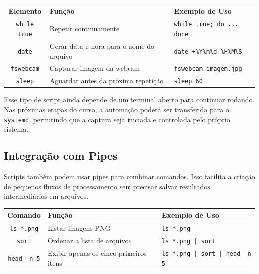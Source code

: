 \documentclass[12pt]{article}
\begin{document}
\begin{cmdbox}
\begin{tabularx}{\linewidth}{@{}C >{\raggedright\arraybackslash}X >{\raggedright\arraybackslash}X@{}}
\toprule
\textbf{Elemento} & \textbf{Função} & \textbf{Exemplo de Uso} \\
\midrule
\texttt{while true} & Repetir continuamente & \texttt{while true; do ... done} \\
\texttt{date} & Gerar data e hora para o nome do arquivo & \texttt{date +\%Y\%m\%d\_\%H\%M\%S} \\
\texttt{fswebcam} & Capturar imagem da webcam & \texttt{fswebcam imagem.jpg} \\
\texttt{sleep} & Aguardar antes da próxima repetição & \texttt{sleep 60} \\
\bottomrule
\end{tabularx}
\end{cmdbox}

Esse tipo de script ainda depende de um terminal aberto para continuar rodando. Nas próximas etapas do curso, a automação poderá ser transferida para o \texttt{systemd}, permitindo que a captura seja iniciada e controlada pelo próprio sistema.

\subsection{Integração com Pipes}

Scripts também podem usar pipes para combinar comandos. Isso facilita a criação de pequenos fluxos de processamento sem precisar salvar resultados intermediários em arquivos.

\begin{cmdbox}
\begin{tabularx}{\linewidth}{@{}C >{\raggedright\arraybackslash}X >{\raggedright\arraybackslash}X@{}}
\toprule
\textbf{Comando} & \textbf{Função} & \textbf{Exemplo de Uso} \\
\midrule
\texttt{ls *.png} & Listar imagens PNG & \texttt{ls *.png} \\
\texttt{sort} & Ordenar a lista de arquivos & \texttt{ls *.png | sort} \\
\texttt{head -n 5} & Exibir apenas os cinco primeiros itens & \texttt{ls *.png | sort | head -n 5} \\
\bottomrule
\end{tabularx}
\end{cmdbox}
\end{document}
